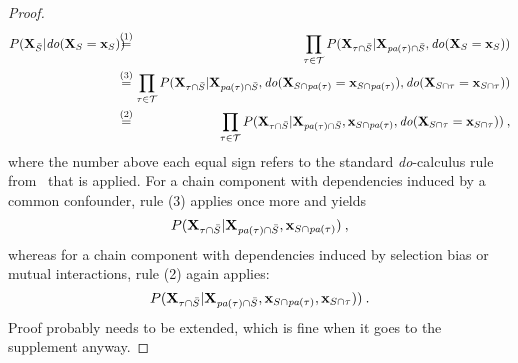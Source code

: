 \documentclass{article}
\newcommand{\vX}{\mathbf{X}}
\newcommand{\vx}{\mathbf{x}}
\newcommand{\dodo}{\mathit{do}}
\newcommand{\lvdo}[1]{\dodo(\vX_{#1} = \vx_{#1})}
\newcommand{\spa}{\mathop{\textit{\scriptsize pa}}}
\newcommand{\chaincomponents}{{\cal T}}
\newcommand{\isequaldo}[1]{\hspace*{-2.5mm} & \overset{(#1)}{=} & \hspace*{-2.5mm}}
\newcommand{\comment}[1]{{\color{red} #1}}
\begin{document}
\begin{proof}
\begin{eqnarray*}
	P(\vX_{\bar{S}}|\lvdo{S}) \isequaldo{1} \prod_{\tau \in \chaincomponents} P(\vX_{\tau \cap \bar{S}}|\vX_{\spa(\tau)  \cap \bar{S}},\lvdo{S}) \hfill \\
	\isequaldo{3}  \prod_{\tau \in \chaincomponents} P(\vX_{\tau \cap \bar{S}}|\vX_{\spa(\tau)  \cap \bar{S}},\lvdo{S \cap \spa(\tau)},\lvdo{S \cap \tau}) \\
	\isequaldo{2}  \prod_{\tau \in \chaincomponents} P(\vX_{\tau \cap \bar{S}}|\vX_{\spa(\tau)  \cap \bar{S}},\vx_{S \cap \spa(\tau)},\lvdo{S \cap \tau}) \: ,
\end{eqnarray*}
where the number above each equal sign refers to the standard \textit{do}-calculus rule from~\cite{pearl2012calculus} that is applied. For a chain component with dependencies induced by a common confounder, rule (3) applies once more and yields
\[
P(\vX_{\tau \cap \bar{S}}|\vX_{\spa(\tau)  \cap \bar{S}},\vx_{S \cap \spa(\tau)}) \: ,
\]
whereas for a chain component with dependencies induced by selection bias or mutual interactions, rule (2) again applies:
\[
P(\vX_{\tau \cap \bar{S}}|\vX_{\spa(\tau)  \cap \bar{S}},\vx_{S \cap \spa(\tau)},\vx_{S \cap \tau})) \: .
\]
\comment{Proof probably needs to be extended, which is fine when it goes to the supplement anyway.}
\end{proof}
\end{document}

